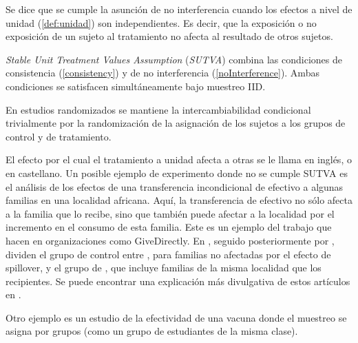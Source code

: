 \begin{definicion}[No interferencia]\label{noInterference}
	Se dice que se cumple la asunción de no interferencia cuando los efectos a nivel de unidad (\ref{def:unidad}) son independientes.
	Es decir, que la exposición o no exposición de un sujeto al tratamiento no afecta al resultado de otros sujetos.
\end{definicion}


\begin{definicion}[SUTVA]
	\textit{Stable Unit Treatment Values Assumption} (\textit{SUTVA}) combina las condiciones de
	consistencia (\ref{consistency}) y de no interferencia (\ref{noInterference}).
	Ambas condiciones se satisfacen simultáneamente bajo muestreo IID.
\end{definicion}

\begin{observacion}\cite[material suplementario S1]{luque2021}
	En estudios randomizados se mantiene la intercambiabilidad condicional
	trivialmente por la randomización de la asignación de los sujetos a
	los grupos de control y de tratamiento.
\end{observacion}

\begin{ejemplo}
	El efecto por el cual el tratamiento a unidad afecta a otras se le llama \textit{} en inglés, o  en castellano.
	Un posible ejemplo de experimento donde no se cumple SUTVA es el análisis %
	de los efectos de una transferencia incondicional de efectivo a algunas familias en una localidad africana.
	Aquí, la transferencia de efectivo no sólo afecta a la familia que lo recibe, sino
	que también puede afectar a la localidad por el incremento en el consumo
	de esta familia.
	Este es un ejemplo del trabajo que hacen en organizaciones como GiveDirectly.
	En \cite{Haushofer2016}, seguido posteriormente por \cite{Egger2022},
	dividen el grupo de control entre , para familias no afectadas por
	el efecto de spillover, y el grupo de , que incluye familias
	de la misma localidad que los recipientes.
	Se puede encontrar una explicación más divulgativa de estos artículos en \cite{GiveDirectly2016}.

	Otro ejemplo es un estudio de la efectividad de una vacuna donde el muestreo se asigna por grupos (como un grupo
	de estudiantes de la misma clase)\cite{oxChapterCausal}.
\end{ejemplo}


